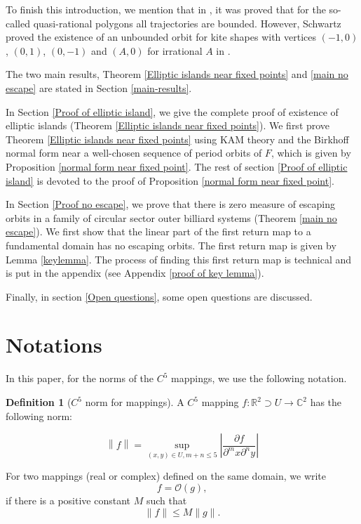 \documentclass{article}
\numberwithin{figure}{section}
\numberwithin{equation}{section}
\theoremstyle{remark}
\theoremstyle{definition}
\newtheorem{definition}{Definition}
\begin{document}
To finish this introduction, we mention that in \cite{gutkin_dual_1992,vivaldi_global_1987}, it was proved that for the so-called quasi-rational polygons all trajectories are bounded. However, Schwartz proved the existence of an unbounded orbit for kite shapes with vertices $\left(-1,0\right)$,  $\left(0,1\right)$,  $\left(0,-1\right)$ and  $\left(A,0\right)$ for irrational $A$ in \cite{schwartz2007unboundedorbitsouterbilliards,schwartz2008outerbilliardskites}.


\bigskip 

 The two main results, Theorem \ref{Elliptic islands near fixed points} and \ref{main no escape} are stated in Section \ref{main-results}. 

In Section \ref{Proof of elliptic island}, we give the complete proof of existence of elliptic islands (Theorem \ref{Elliptic islands near fixed points}). We first prove Theorem \ref{Elliptic islands near fixed points} using KAM theory and the Birkhoff normal form near a well-chosen sequence of period orbits of $F$, which is given by Proposition \ref{normal form near fixed point}. The rest of section \ref{Proof of elliptic island} is devoted to the proof of Proposition \ref{normal form near fixed point}.

In Section \ref{Proof no escape}, we prove that there is zero measure of escaping orbits in a family of circular sector outer billiard systems (Theorem \ref{main no escape}). We first show that the linear part of the first return map to a fundamental domain has no escaping orbits. The first return map is given by Lemma \ref{keylemma}. The process of finding this first return map is technical and is put in the appendix (see Appendix \ref{proof of key lemma}).

 

Finally, in section \ref{Open questions}, some open questions are discussed.

\section{Notations}
In this paper, for the norms of the $C^5$ mappings, we use the following notation.
\begin{definition}[$C^5$ norm for mappings]
   A $C^5$ mapping $f: \mathbb{R}^2 \supset U \rightarrow \mathbb{C}^2$ has the following norm:
   
   $$\left\|f\right\|=\sup_{(x,y)\in U,m+n\leq 5}\left \vert\frac{\partial f}{\partial^mx\partial^ny}\right\vert$$
\end{definition}
For two mappings (real or complex) defined on the same domain, we write 
$$f = \mathcal{O}(g),$$
if there is a positive constant $M$ such that 
$$\| f \| \leq {M}{\|g \|}.$$
\end{document}
